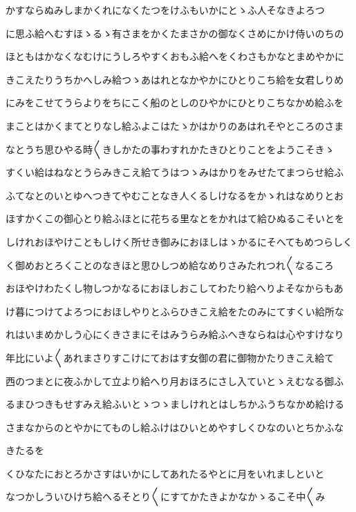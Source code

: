 \documentclass[a4paper,11pt,landscape]{ltjtarticle}
\begin{document}
かすならぬみしまかくれになくたつをけふもいかにとゝふ人そなきよろつ
\par\medskip
に思ふ給へむすほゝるゝ有さまをかくたまさかの御なくさめにかけ侍いのちの
\par\medskip
ほともはかなくなむけにうしろやすくおもふ給へをくわさもかなとまめやかに
\par\medskip
きこえたりうちかへしみ給つゝあはれとなかやかにひとりこち給を女君しりめ
\par\medskip
にみをこせてうらよりをちにこく船のとしのひやかにひとりこちなかめ給ふを
\par\medskip
まことはかくまてとりなし給ふよこはたゝかはかりのあはれそやところのさま
\par\medskip
なとうち思ひやる時〱きしかたの事わすれかたきひとりことをようこそきゝ
\par\medskip
すくい給はねなとうらみきこえ給てうはつゝみはかりをみせたてまつらせ給ふ
\par\medskip
ふてなとのいとゆへつきてやむことなき人くるしけなるをかゝれはなめりとお
\par\medskip
ほすかくこの御心とり給ふほとに花ちる里なとをかれはて給ひぬるこそいとを
\par\medskip
しけれおほやけこともしけく所せき御みにおほしはゝかるにそへてもめつらしく
\par\medskip
く御めおとろくことのなきほと思ひしつめ給なめりさみたれつれ〱なるころ
\par\medskip
おほやけわたくし物しつかなるにおほしおこしてわたり給へりよそなからもあ
\par\medskip
け暮につけてよろつにおほしやりとふらひきこえ給をたのみにてすくい給所な
\par\medskip
れはいまめかしう心にくきさまにそはみうらみ給ふへきならねは心やすけなり
\par\medskip
年比にいよ〱あれまさりすこけにておはす女御の君に御物かたりきこえ給て
\par\medskip
西のつまとに夜ふかして立より給へり月おほろにさし入ていとゝえむなる御ふ
\par\medskip
るまひつきもせすみえ給ふいとゝつゝましけれとはしちかふうちなかめ給ける
\par\medskip
さまなからのとやかにてものし給ふけはひいとめやすしくひなのいとちかふな
\par\medskip
きたるを
\par\medskip
くひなたにおとろかさすはいかにしてあれたるやとに月をいれましといと
\par\medskip
なつかしういひけち給へるそとり〱にすてかたきよかなかゝるこそ中〱み
\par\medskip
\end{document}
